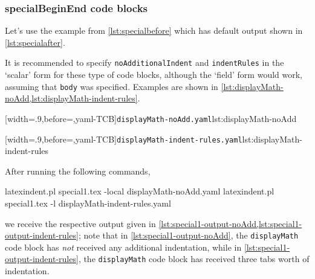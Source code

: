 \subsubsection{specialBeginEnd code blocks}
 Let's use the example from \vref{lst:specialbefore} which has default output shown in
 \vref{lst:specialafter}.

 It is recommended to specify \texttt{noAdditionalIndent} and \texttt{indentRules} in the
 `scalar' form for these type of code blocks, although the `field' form would work,
 assuming that \texttt{body} was specified. Examples are shown in
 \cref{lst:displayMath-noAdd,lst:displayMath-indent-rules}.
  

 \begin{minipage}{.49\textwidth}
  [width=.9\linewidth,before=\centering,yaml-TCB]{\texttt{displayMath-noAdd.yaml}}{lst:displayMath-noAdd}
 \end{minipage}
 \hfill
 \begin{minipage}{.49\textwidth}
  [width=.9\linewidth,before=\centering,yaml-TCB]{\texttt{displayMath-indent-rules.yaml}}{lst:displayMath-indent-rules}
 \end{minipage}

 After running the following commands, 
 \begin{commandshell}
latexindent.pl special1.tex -local displayMath-noAdd.yaml  
latexindent.pl special1.tex -l displayMath-indent-rules.yaml  
\end{commandshell}
 we receive the respective output given in
 \cref{lst:special1-output-noAdd,lst:special1-output-indent-rules}; note that in
 \cref{lst:special1-output-noAdd}, the \texttt{displayMath} code block has \emph{not}
 received any additional indentation, while in \cref{lst:special1-output-indent-rules},
 the \texttt{displayMath} code block has received three tabs worth of indentation.

 \begin{minipage}{.45\textwidth}
 \end{minipage}
 \hfill
 \begin{minipage}{.45\textwidth}
 \end{minipage}

